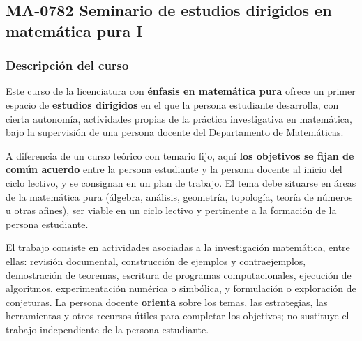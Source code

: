 \newpage
\subsection*{MA-0782 Seminario de estudios dirigidos en matemática pura I}

\hypertarget{MA0782}{}
\begin{refsection}
\begin{table}[H]
\end{table}

\subsubsection*{Descripción del curso}

Este curso de la licenciatura con \textbf{énfasis en matemática pura} ofrece un primer espacio de \textbf{estudios dirigidos} en el que la persona estudiante desarrolla, con cierta autonomía, actividades propias de la práctica investigativa en matemática, bajo la supervisión de una persona docente del Departamento de Matemáticas.

A diferencia de un curso teórico con temario fijo, aquí \textbf{los objetivos se fijan de común acuerdo} entre la persona estudiante y la persona docente al inicio del ciclo lectivo, y se consignan en un plan de trabajo. El tema debe situarse en áreas de la matemática pura (álgebra, análisis, geometría, topología, teoría de números u otras afines), ser viable en un ciclo lectivo y pertinente a la formación de la persona estudiante.

El trabajo consiste en actividades asociadas a la investigación matemática, entre ellas: revisión documental, construcción de ejemplos y contraejemplos, demostración de teoremas, escritura de programas computacionales, ejecución de algoritmos, experimentación numérica o simbólica, y formulación o exploración de conjeturas. La persona docente \textbf{orienta} sobre los temas, las estrategias, las herramientas y otros recursos útiles para completar los objetivos; no sustituye el trabajo independiente de la persona estudiante.


\end{refsection}
